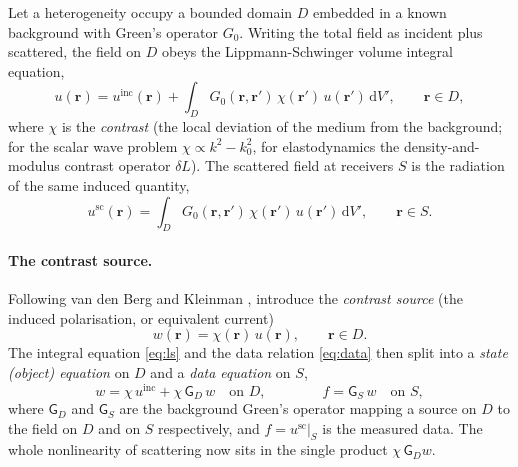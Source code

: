 \documentclass[11pt,a4paper]{article}
\newcommand{\rd}{\mathrm{d}}
\newcommand{\vr}{\mathbf{r}}
\newcommand{\uinc}{u^{\mathrm{inc}}}
\newcommand{\Gop}{\mathsf{G}}
\begin{document}
Let a heterogeneity occupy a bounded domain $D$ embedded in a known background with Green's
operator $G_0$. Writing the total field as incident plus scattered, the field on $D$ obeys the
Lippmann-Schwinger volume integral equation,
\begin{equation}
\label{eq:ls}
u(\vr)=\uinc(\vr)+\int_D G_0(\vr,\vr')\,\chi(\vr')\,u(\vr')\,\rd V', \qquad \vr\in D,
\end{equation}
where $\chi$ is the \emph{contrast} (the local deviation of the medium from the background; for
the scalar wave problem $\chi\propto k^2-k_0^2$, for elastodynamics the density-and-modulus
contrast operator $\delta L$). The scattered field at receivers $S$ is the radiation of the
same induced quantity,
\begin{equation}
\label{eq:data}
u^{\mathrm{sc}}(\vr)=\int_D G_0(\vr,\vr')\,\chi(\vr')\,u(\vr')\,\rd V', \qquad \vr\in S .
\end{equation}

\paragraph{The contrast source.} Following van den Berg and Kleinman \cite{vdBKleinman1997},
introduce the \emph{contrast source} (the induced polarisation, or equivalent current)
\begin{equation}
w(\vr)=\chi(\vr)\,u(\vr), \qquad \vr\in D .
\end{equation}
The integral equation \eqref{eq:ls} and the data relation \eqref{eq:data} then split into a
\emph{state (object) equation} on $D$ and a \emph{data equation} on $S$,
\begin{equation}
\label{eq:cs}
w=\chi\,\uinc+\chi\,\Gop_D\, w \quad\text{on } D,
\qquad\qquad
f=\Gop_S\, w \quad\text{on } S,
\end{equation}
where $\Gop_D$ and $\Gop_S$ are the background Green's operator mapping a source on $D$ to the
field on $D$ and on $S$ respectively, and $f=u^{\mathrm{sc}}|_S$ is the measured data. The whole
nonlinearity of scattering now sits in the single product $\chi\,\Gop_D w$.
\end{document}
